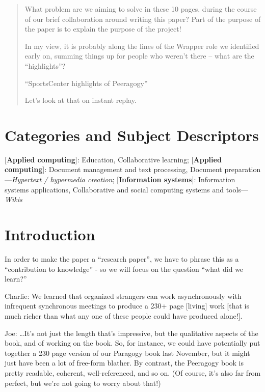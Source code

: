 \documentclass{acm_proc_article-sp}
\begin{document}

\maketitle
\begin{abstract}
What problem are we aiming to solve in these 10 pages, during the
course of our brief collaboration around writing this paper? Part of
the purpose of the paper is to explain the purpose of the project!

In my view, it is probably along the lines of the Wrapper role we
identified early on, summing things up for people who weren't there --
what are the ``highlights''?

``SportsCenter highlights of Peeragogy''

Let's look at that on instant replay.
\end{abstract}

\section*{Categories and Subject Descriptors}
[{\bf Applied computing}]: {Education}, {Collaborative learning};
[{\bf Applied computing}]: {Document management and text processing}, {Document preparation}---\emph{Hypertext / hypermedia creation};
[{\bf Information systems}]: {Information systems applications}, {Collaborative and social computing systems and tools}---\emph{Wikis}



\section{Introduction}

In order to make the paper a ``research paper'', we have to phrase
this as a ``contribution to knowledge'' - so we will focus on the
question ``what did we learn?''

Charlie: We learned that organized strangers can work asynchronously
with infrequent synchronous meetings to produce a 230+ page [living]
work [that is much richer than what any one of these people could have
  produced alone!].

Joe: \ldots It's not just the length that's impressive, but the
qualitative aspects of the book, and of working on the book. So, for
instance, we could have potentially put together a 230 page version of
our Paragogy book last November, but it might just have been a lot of
free-form blather. By contrast, the Peeragogy book is pretty readable,
coherent, well-referenced, and so on. (Of course, it's also far from
perfect, but we're not going to worry about that!)
\end{document}
